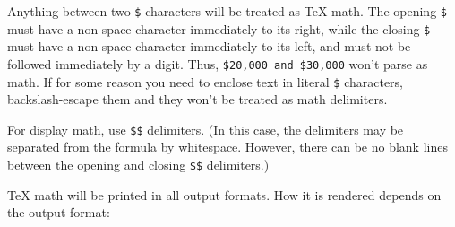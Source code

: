 \documentclass[
  b5paper
]{book}
\begin{document}
Anything between two \texttt{\$} characters will be treated as TeX math.
The opening \texttt{\$} must have a non-space character immediately to
its right, while the closing \texttt{\$} must have a non-space character
immediately to its left, and must not be followed immediately by a
digit. Thus, \texttt{\$20,000\ and\ \$30,000} won't parse as math. If
for some reason you need to enclose text in literal \texttt{\$}
characters, backslash-escape them and they won't be treated as math
delimiters.

For display math, use \texttt{\$\$} delimiters. (In this case, the
delimiters may be separated from the formula by whitespace. However,
there can be no blank lines between the opening and closing
\texttt{\$\$} delimiters.)

TeX math will be printed in all output formats. How it is rendered
depends on the output format:
\end{document}
